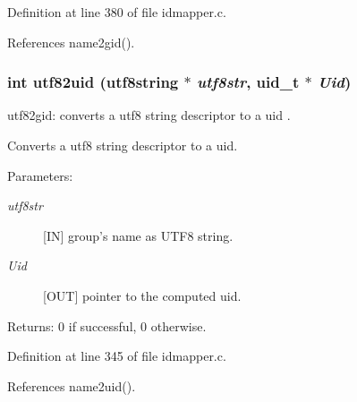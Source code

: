 Definition at line 380 of file idmapper.c.

References name2gid().
\subsubsection{\setlength{\rightskip}{0pt plus 5cm}int utf82uid (utf8string $\ast$ {\em utf8str}, uid\_\-t $\ast$ {\em Uid})}\label{idmapper_8c_a8}


utf82gid: converts a utf8 string descriptor to a uid .

Converts a utf8 string descriptor to a uid.

\begin{Desc}
\item[Parameters:]
\begin{description}
\item[{\em utf8str}][IN] group's name as UTF8 string. \item[{\em Uid}][OUT] pointer to the computed uid.\end{description}
\end{Desc}
\begin{Desc}
\item[Returns:]0 if successful, 0 otherwise. \end{Desc}


Definition at line 345 of file idmapper.c.

References name2uid().